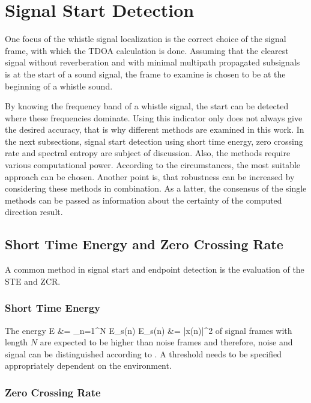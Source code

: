 \section{Signal Start Detection}
\label{sec:02_signalStartDetection}

One focus of the whistle signal localization is the correct choice of the
signal frame, with which the \ac{TDOA} calculation is done.
Assuming that the clearest signal without reverberation and with minimal
multipath propagated subsignals is at the start of a sound signal,
the frame to examine is chosen to be at the beginning of a whistle sound.

By knowing the frequency band of a whistle signal, the start can be detected
where these frequencies dominate.
Using this indicator only does not always give the desired accuracy, that is why
different methods are examined in this work.
In the next subsections, signal start detection using short time energy,
zero crossing rate and spectral entropy are subject of discussion.
Also, the methods require
various computational power. According to the circumstances, the most suitable
approach can be chosen.
Another point is, that robustness can be increased by considering these methods
in combination.
As a latter, the consensus of the single methods can be passed as information
about the certainty of the computed direction result.

\subsection{Short Time Energy and Zero Crossing Rate}

A common method in signal start and endpoint detection is the evaluation
of the \ac{STE} and \ac{ZCR}.

\subsubsection{Short Time Energy}
The energy
\bal
    E &= \sum_{n=1}^N E_s(n)
    \label{eq:02_energy}
    E_s(n) &= |x(n)|^2
    \label{eq:02_spectralEnergy}
\eal
of signal frames with length $N$ are expected to be higher than noise frames
and therefore, noise and signal can be distinguished
according to \cite{Z_W_voiceActivity}.
A threshold needs to be specified appropriately dependent on the environment.

\subsubsection{Zero Crossing Rate}

